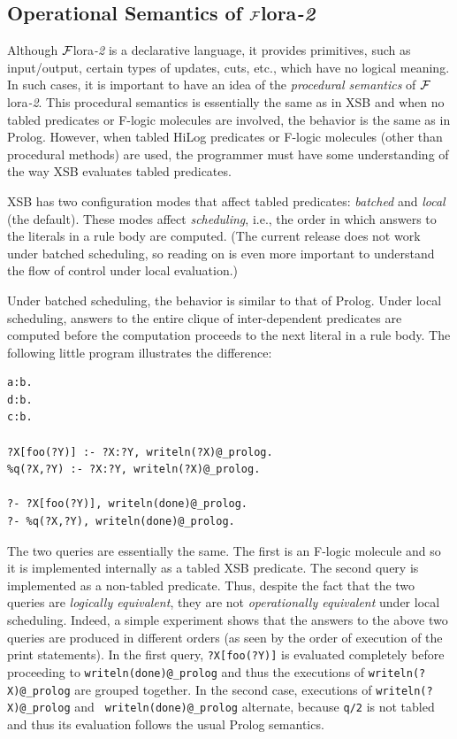 \documentclass[11pt]{article}
\newcommand{\FLORA}{{\mbox{\sc ${\cal F}${lora}\rm\emph{-2}}}\xspace}
\newcommand{\fl}{\mbox{F-logic}\xspace}
\begin{document}
\subsection{Operational Semantics of \FLORA}\label{sec-flora-procedural}

Although \FLORA is a declarative language, it provides primitives, such as
input/output, certain types of updates, cuts, etc., which have no logical
meaning. In such cases, it is important to have an idea of the
\emph{procedural semantics} of \FLORA. This procedural semantics is
essentially the same as in XSB and when no tabled predicates or \fl molecules
are involved, the behavior is the same as in Prolog. However, when tabled
HiLog predicates or \fl molecules (other than procedural methods) are used,
the programmer must have some understanding of the way XSB evaluates tabled
predicates.

XSB has two configuration modes that affect tabled predicates:
\emph{batched} and \emph{local} (the default). These modes affect
\emph{scheduling}, i.e., the order in which answers to the literals
in a rule body are computed.
(The current release does not work under batched scheduling, so reading on
is even more important to understand the flow of control under local
evaluation.)

Under batched scheduling, the behavior is similar to that of Prolog.
Under local scheduling, answers to the entire clique of inter-dependent
predicates are computed before the computation proceeds to the next literal
in a rule body. The following little program illustrates the difference:
\begin{verbatim}
a:b.
d:b.
c:b.

?X[foo(?Y)] :- ?X:?Y, writeln(?X)@_prolog.
%q(?X,?Y) :- ?X:?Y, writeln(?X)@_prolog.

?- ?X[foo(?Y)], writeln(done)@_prolog.
?- %q(?X,?Y), writeln(done)@_prolog.
\end{verbatim}
The two queries are essentially the same. The first is an \fl molecule
and so it is implemented internally as a tabled XSB predicate. The
second query is implemented as a non-tabled predicate.  Thus, despite
the fact that the two queries are \emph{logically equivalent}, they are
not \emph{operationally equivalent} under local scheduling.  Indeed, a
simple experiment shows that the answers to the above two queries are
produced in different orders (as seen by the order of execution of the
print statements).  In the first query, \verb|?X[foo(?Y)]| is evaluated
completely before proceeding to {\tt writeln(done)@\_prolog} and thus
the executions of {\tt writeln(?X)@\_prolog} are grouped together. In the
second case, executions of {\tt writeln(?X)@\_prolog} and {\tt
writeln(done)@\_prolog} alternate, because {\tt \verb|q|/2} is not tabled
and thus its evaluation follows the usual Prolog semantics.
\end{document}
